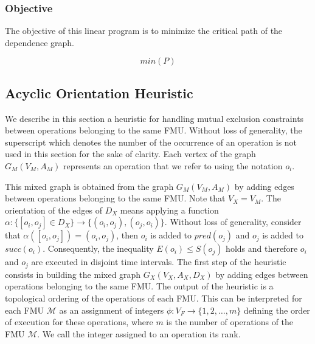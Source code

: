 \subsubsection{Objective}

The objective of this linear program is to minimize the critical path of the dependence graph.

\begin{equation}
min(P)
\label{orient:obj}
\end{equation}


\subsection{Acyclic Orientation Heuristic}

We describe in this section a heuristic for handling mutual exclusion constraints between operations belonging to the same FMU. Without loss of generality, the superscript which denotes the number of the occurrence of an operation is not used in this section for the sake of clarity. Each vertex of the graph $G_M(V_M,A_M)$ represents an operation that we refer to using the notation $o_i$.

This mixed graph is obtained from the graph $G_M(V_M,A_M)$ by adding edges between operations belonging to the same FMU. Note that $V_X = V_M$. The orientation of the edges of $D_X$ means applying a function $\alpha :  \{[o_i,o_j] \in D_X\} \rightarrow \{(o_i,o_j),(o_j,o_i)\}$. Without loss of generality, consider that $\alpha([o_i,o_j]) = (o_i,o_j)$, then $o_i$ is added to $pred(o_j)$ and $o_j$ is added to $succ(o_i)$. Consequently, the inequality $E(o_i) \leq S(o_j)$ holds and therefore $o_i$ and $o_j$ are executed in disjoint time intervals. The first step of the heuristic consists in building the mixed graph $G_X(V_X,A_X,D_X)$ by adding edges between operations belonging to the same FMU. The output of the heuristic is a topological ordering of the operations of each FMU. This can be interpreted for each FMU $\mathcal{M}$ as an assignment of integers $\phi : V_F \rightarrow \{1,2, \dots ,m\}$ defining the order of execution for these operations, where $m$ is the number of operations of the FMU $\mathcal{M}$. We call the integer assigned to an operation its rank.

